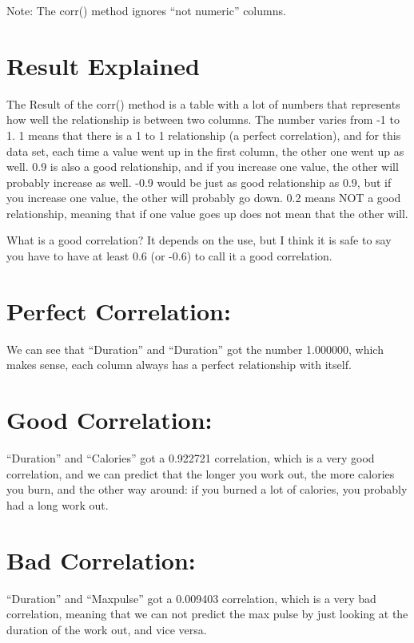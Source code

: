 \documentclass[11pt]{article}
\begin{document}
    Note: The corr() method ignores ``not numeric'' columns.

    \section{Result Explained}\label{ii.-result-explained}

The Result of the corr() method is a table with a lot of numbers that
represents how well the relationship is between two columns. The number
varies from -1 to 1. 1 means that there is a 1 to 1 relationship (a
perfect correlation), and for this data set, each time a value went up
in the first column, the other one went up as well. 0.9 is also a good
relationship, and if you increase one value, the other will probably
increase as well. -0.9 would be just as good relationship as 0.9, but if
you increase one value, the other will probably go down. 0.2 means NOT a
good relationship, meaning that if one value goes up does not mean that
the other will.

    What is a good correlation? It depends on the use, but I think it is
safe to say you have to have at least 0.6 (or -0.6) to call it a good
correlation.

    \section{Perfect Correlation:}\label{iii.-perfect-correlation}

We can see that ``Duration'' and ``Duration'' got the number 1.000000,
which makes sense, each column always has a perfect relationship with
itself.

    \section{Good Correlation:}\label{iv.-good-correlation}

``Duration'' and ``Calories'' got a 0.922721 correlation, which is a
very good correlation, and we can predict that the longer you work out,
the more calories you burn, and the other way around: if you burned a
lot of calories, you probably had a long work out.

    \section{Bad Correlation:}\label{v.-bad-correlation}

``Duration'' and ``Maxpulse'' got a 0.009403 correlation, which is a
very bad correlation, meaning that we can not predict the max pulse by
just looking at the duration of the work out, and vice versa.


    
    
    
\end{document}
